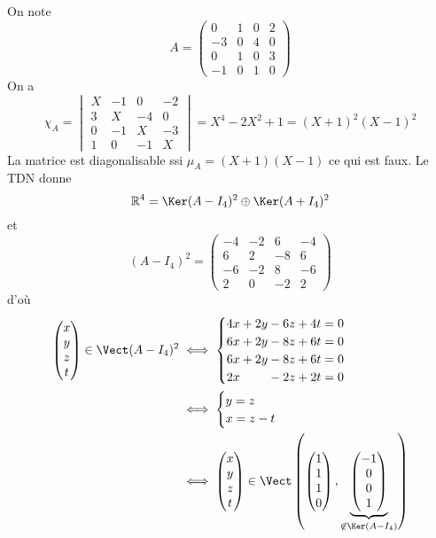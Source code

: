 On note \[
    A= \begin{pmatrix}
        0 & 1 & 0 & 2 \\ 
        -3 & 0 & 4 & 0\\
        0 & 1 & 0 & 3\\
        -1 & 0 & 1 & 0
    \end{pmatrix}
\]
On a \[
    \chi_A= \begin{vmatrix}
        X & -1 & 0 & -2 \\ 
        3 & X & -4 & 0\\
        0 & -1 & X & -3\\
        1 & 0 & -1 & X
    \end{vmatrix}= X^4-2X^2+1=(X+1)^2(X-1)^2
\]
La matrice est diagonalisable ssi $\mu_A=(X+1)(X-1)$ ce qui est faux. Le TDN donne \[
    \mathbb R^4=\Ker(A-I_4)^2\oplus \Ker(A+I_4)^2
\]
et \[
    (A-I_4)^2= 
    \begin{pmatrix}-4&-2&6&-4\\6&2&-8&6\\-6&-2&8&-6\\2&0&-2&2\end{pmatrix}
\]
d'où \begin{align*}
    \begin{pmatrix}
        x\\y\\z\\t
    \end{pmatrix} \in \Vect(A-I_4)^2 &\iff \begin{cases}
        4x+2y-6z+4t=0 \\
        6x+2y-8z+6t=0 \\
        6x+2y-8z+6t=0 \\
        2x\phantom{+2y\;\,}-2z+2t=0
    \end{cases} \\
    &\iff \begin{cases}
        y=z \\
        x=z-t
    \end{cases}\\
    & \iff
    \begin{pmatrix}
        x\\y\\z\\t
    \end{pmatrix}\in\Vect \left( \begin{pmatrix}
        1\\1\\1\\0
        \end{pmatrix}, \underbrace{\begin{pmatrix}
        -1\\0\\0\\1
    \end{pmatrix}}_{\not\in\Ker(A-I_4)} \right)
\end{align*}


